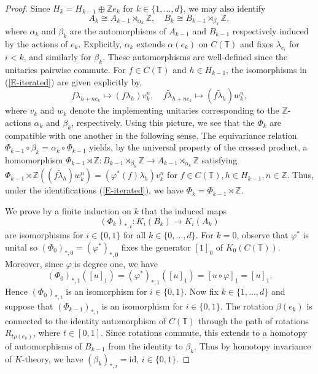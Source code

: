 \documentclass[11pt,a4paper,leqno]{amsart}
\theoremstyle{definition}
\theoremstyle{remark}
\numberwithin{equation}{section}
\theoremstyle{plain}
\newcommand{\Zb}{\mathbb{Z}}
\newcommand{\Tb}{\mathbb{T}}
\begin{document}
\begin{proof}
	Since $H_k = H_{k-1} \oplus \Zb e_k$ for $k \in \{1,\ldots,d\}$, we may also identify 
	\begin{equation}\label{E-iterated}
	A_k \cong A_{k-1} \rtimes_{\alpha_k} \Zb, \quad B_k \cong B_{k-1} \rtimes_{\beta_k} \Zb,
	\end{equation}
where $\alpha_k$ and $\beta_k$ are the automorphisms of $A_{k-1}$ and $B_{k-1}$ respectively induced by the actions of $e_k$. Explicitly, $\alpha_k$ extends $\alpha(e_k)$ on $C(\Tb)$ and fixes $\lambda_{e_i}$ for $i < k$, and similarly for $\beta_k$. These automorphisms are well-defined since the unitaries pairwise commute. For $f\in C(\Tb)$ and $h\in H_{k-1}$, the isomorphisms in (\ref{E-iterated}) are given explicitly by, 
\[
	f\lambda_{h+ne_k} \mapsto (f\lambda_h) v_k^n, \quad  f\tilde\lambda_{h+ne_k} \mapsto (f\tilde\lambda_h) w_k^n, 
\]
where $v_k$ and $w_k$ denote the implementing unitaries corresponding to the $\Zb$-actions $\alpha_k$ and $\beta_k$, respectively. Using this picture, we see that the $\Phi_k$ are compatible with one another in the following sense. The equivariance relation $\Phi_{k-1} \circ \beta_k = \alpha_k \circ \Phi_{k-1}$ yields, by the universal property of the crossed product, a homomorphism $\Phi_{k-1}\rtimes \Zb : B_{k-1} \rtimes_{\beta_k} \Zb \longrightarrow A_{k-1} \rtimes_{\alpha_k} \Zb$ satisfying $\Phi_{k-1}\rtimes \Zb((f\tilde{\lambda}_h) w_k^n) = (\varphi^*(f)\lambda_h) v_k^n$ for $f\in C(\Tb), h\in H_{k-1}, n\in \Zb$. Thus, under the identifications (\ref{E-iterated}), we have $\Phi_k = \Phi_{k-1} \rtimes \Zb$.  
	
	We prove by a finite induction on $k$ that the induced maps 
	\[
		(\Phi_k)_{*,i} : K_i(B_k) \longrightarrow K_i(A_k)
	\]
	are isomorphisms for $i\in \{0,1\}$ for all $k \in \{0,\ldots,d\}$. For $k = 0$, observe that $\varphi^*$ is unital so $(\Phi_0)_{*,0} = (\varphi^*)_{*,0}$ fixes the generator $[1]_0$ of $K_0(C(\Tb))$. Moreover, since $\varphi$ is degree one, we have 
	\[(\Phi_0)_{*,1}([u]_1) = (\varphi^*)_{*,1}([u]_1) = [u\circ \varphi]_1 = [u]_1.\] 
	Hence $(\Phi_0)_{*,i}$ is an isomorphism for $i \in \{0,1\}$. Now fix $k\in \{1,\ldots,d\}$ and suppose that $(\Phi_{k-1})_{*,i}$ is an isomorphism for $i\in \{0,1\}$. The rotation $\beta({e_k})$ is connected to the identity automorphism of $C(\Tb)$ through the path of rotations $R_{t\rho(e_k)}$, where $t\in [0,1]$. Since rotations commute, this extends to a homotopy of automorphisms of $B_{k-1}$ from the identity to $\beta_k$. Thus by homotopy invariance of $K$-theory, we have $(\beta_k)_{*,i} = \mathrm{id}$, $i\in\{0,1\}$.  


\end{proof}
\end{document}
